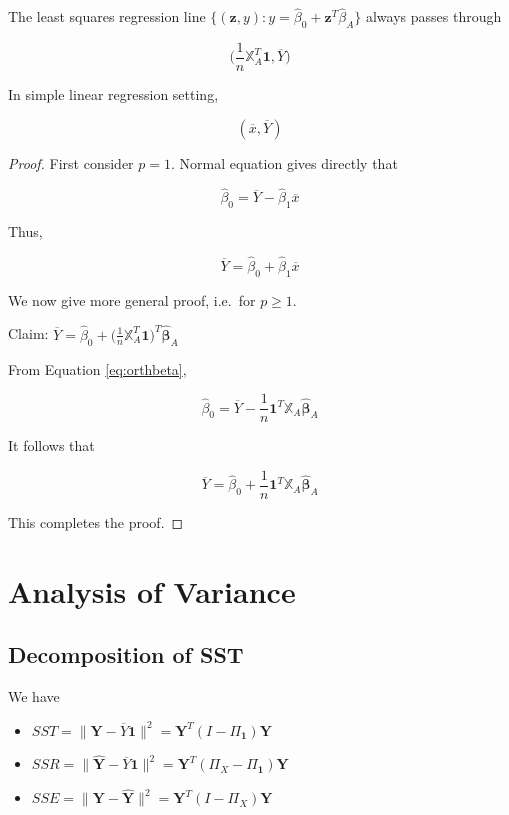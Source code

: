 \documentclass[]{book}
\providecommand{\tightlist}{%
  \setlength{\itemsep}{0pt}\setlength{\parskip}{0pt}}
\theoremstyle{definition}
\theoremstyle{definition}
\theoremstyle{definition}
\theoremstyle{remark}
\let\BeginKnitrBlock\begin \let\EndKnitrBlock\end
\begin{document}
\BeginKnitrBlock{remark}
{}The least squares regression line \(\{ (\mathbf{z}, y) : y = \hat\beta_0 + \mathbf{z}^T\hat\beta_A \}\) always passes through

\[\bigg( \frac{1}{n} \mathbb{X}_A^T \mathbf{1}, \overline{Y} \bigg)\]

In simple linear regression setting,

\[(\overline{x}, \overline{Y})\]
\EndKnitrBlock{remark}

\BeginKnitrBlock{proof}
{}First consider \(p = 1\). Normal equation gives directly that

\[\hat\beta_0 = \overline{Y} - \hat\beta_1 \overline{x}\]

Thus,

\[\overline{Y} = \hat\beta_0 + \hat\beta_1 \overline{x}\]

We now give more general proof, i.e.~for \(p \ge 1\).

Claim: \(\overline{Y} = \hat\beta_0 + \bigg(\frac{1}{n} \mathbb{X}_A^T \mathbf{1} \bigg)^T \boldsymbol{\hat\beta}_A\)

From Equation \eqref{eq:orthbeta},

\[\hat\beta_0 = \overline{Y} - \frac{1}{n}\mathbf{1}^T\mathbb{X}_A\boldsymbol{\hat\beta}_A\]

It follows that

\[\overline{Y} = \hat\beta_0 + \frac{1}{n}\mathbf{1}^T\mathbb{X}_A\boldsymbol{\hat\beta}_A\]

This completes the proof.
\EndKnitrBlock{proof}

\hypertarget{analysis-of-variance-1}{%
\section{Analysis of Variance}\label{analysis-of-variance-1}}

\hypertarget{decomposition-of-sst}{%
\subsection{Decomposition of SST}\label{decomposition-of-sst}}

We have

\begin{itemize}
\tightlist
\item
  \(SST = \lVert \mathbf{Y} - \overline{Y}\mathbf{1} \rVert^2 = \mathbf{Y}^T(I - \Pi_{\mathbf{1}})\mathbf{Y}\)
\item
  \(SSR = \lVert \mathbf{\hat{Y}} - \overline{Y}\mathbf{1} \rVert^2 = \mathbf{Y}^T(\Pi_X - \Pi_{\mathbf{1}})\mathbf{Y}\)
\item
  \(SSE = \lVert \mathbf{Y} - \mathbf{\hat{Y}} \rVert^2 = \mathbf{Y}^T(I - \Pi_X)\mathbf{Y}\)
\end{itemize}
\end{document}
